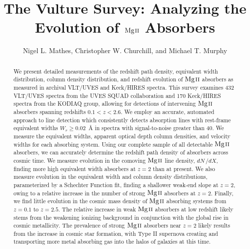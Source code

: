 \documentclass[iop,apj,numberedappendix,appendixfloats,twocolappendix]{emulateapj}
\begin{document}
\title{The Vulture Survey: Analyzing the Evolution of ${\hbox{{\rm Mg}\kern 0.1em{\sc ii}}}$ Absorbers}

\author{
Nigel L. Mathes,
Christopher W. Churchill,
and
Michael T. Murphy
}


\begin{abstract}
We present detailed measurements of the redshift path density, equivalent width distribution, column density distribution, and redshift evolution of ${\hbox{{\rm Mg}\kern 0.1em{\sc ii}}}$ absorbers as measured in archival VLT/UVES and Keck/HIRES spectra. This survey examines 432 VLT/UVES spectra from the UVES SQUAD collaboration and 170 Keck/HIRES spectra from the KODIAQ group, allowing for detections of intervening ${\hbox{{\rm Mg}\kern 0.1em{\sc ii}}}$ absorbers spanning redshifts $0.1 < z < 2.6$. We employ an accurate, automated approach to line detection which consistently detects absorption lines with rest-frame equivalent widths $W_r \ge 0.02$~{\AA} in spectra with signal-to-noise greater than 40. We measure the equivalent widths, apparent optical depth column densities, and velocity widths for each absorbing system. Using our complete sample of all detectable ${\hbox{{\rm Mg}\kern 0.1em{\sc ii}}}$ absorbers, we can accurately determine the redshift path density of absorbers across cosmic time. We measure evolution in the comoving ${\hbox{{\rm Mg}\kern 0.1em{\sc ii}}}$ line density, $dN\,/dX$, finding more high equivalent width absorbers at $z = 2$ than at present. We also measure evolution in the equivalent width and column density distributions, parameterized by a Schechter Function fit, finding a shallower weak-end slope at $z = 2$, owing to a relative increase in the number of strong ${\hbox{{\rm Mg}\kern 0.1em{\sc ii}}}$ absorbers at $z = 2$. Finally, we find little evolution in the cosmic mass density of ${\hbox{{\rm Mg}\kern 0.1em{\sc ii}}}$ absorbing systems from $z = 0.1$ to $z = 2.5$. The relative increase in weak ${\hbox{{\rm Mg}\kern 0.1em{\sc ii}}}$ absorbers at low redshift likely stems from the weakening ionizing background in conjunction with the global rise in cosmic metallicity. The prevalence of strong ${\hbox{{\rm Mg}\kern 0.1em{\sc ii}}}$ absorbers near $z = 2$ likely results from the increase in cosmic star formation, with Type II supernova creating and transporting more metal absorbing gas into the halos of galaxies at this time. 

\end{abstract}

\end{document}
